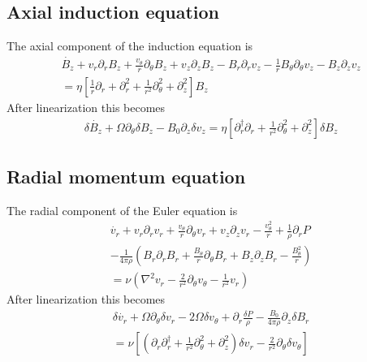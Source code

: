 \documentclass[letterpaper]{article}
\begin{document}
\subsection{Axial induction equation}
The axial component of the induction equation is
\begin{align}
\dot{B_z} + v_r \partial_r B_z + \frac{v_\theta}{r}\partial_\theta B_z
 + v_z \partial_z B_z - B_r \partial_r v_z
 - \frac{1}{r}B_\theta \partial_\theta v_z - B_z \partial_z v_z
\nonumber \\
=\eta\left[\frac{1}{r}\partial_r + \partial_r^2
 + \frac{1}{r^2}\partial_\theta^2 + \partial_z^2\right]B_z
\end{align}
After linearization this becomes
\begin{align}
\delta\dot{B_z} + \Omega\partial_\theta \delta B_z - B_0\partial_z \delta v_z
 = \eta\left[\partial_r^\dagger \partial_r + \frac{1}{r^2}\partial_\theta^2
 + \partial_z^2\right]\delta B_z
\end{align}

\subsection{Radial momentum equation}

The radial component of the Euler equation is
\begin{align}
\dot{v_r} + v_r \partial_r v_r + \frac{v_\theta}{r}\partial_\theta v_r
 + v_z \partial_z v_r - \frac{v_\theta^2}{r}+\frac{1}{\rho}\partial_r P 
\nonumber \\
- \frac{1}{4\pi\rho}\left(B_r \partial_r B_r
 + \frac{B_\theta}{r}\partial_\theta B_r + B_z \partial_z B_r
 - \frac{B_\theta^2}{r}\right)
\nonumber \\
= \nu\left(\nabla^2 v_r -\frac{2}{r^2}\partial_\theta v_\theta
 - \frac{1}{r^2}v_r\right)
\end{align}
After linearization this becomes
\begin{align}
\delta\dot{v_r} + \Omega \partial_\theta \delta v_r - 2\Omega\delta v_\theta
 + \partial_r \frac{\delta P}{\rho}
 - \frac{B_0}{4\pi\rho}\partial_z \delta B_r
\nonumber \\
= \nu \left[\left(\partial_r \partial_r^\dagger
 + \frac{1}{r^2}\partial_\theta^2 + \partial_z^2\right)\delta v_r
 - \frac{2}{r^2}\partial_\theta \delta v_\theta\right]
\end{align}
\end{document}
